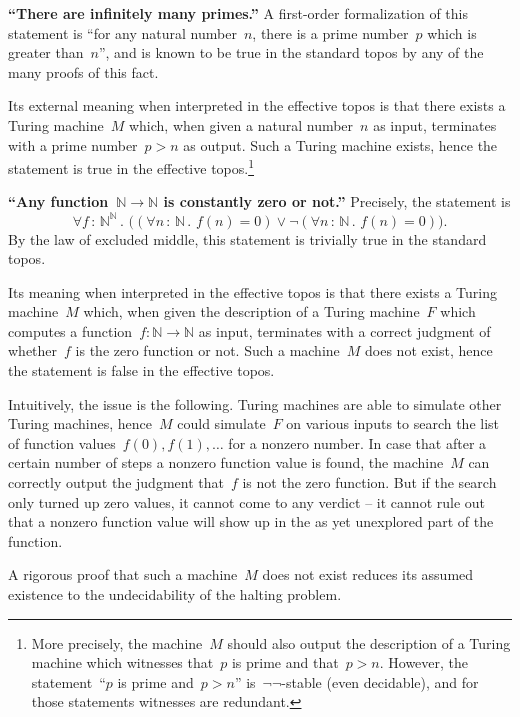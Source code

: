 \documentclass[graybox]{svmult}
\newcommand{\NN}{\mathbb{N}}
\renewcommand{\_}{\mathpunct{.}\,}
\newcommand{\effective}{ef{}fective\xspace}
\newcommand{\?}{\,{:}\,}
\begin{document}
\begin{example}\textbf{``There are infinitely many primes.''} A first-order formalization
of this statement is ``for any natural number~$n$, there is a prime
number~$p$ which is greater than~$n$'', and is known to be true in the standard
topos by any of the many proofs of this fact.

Its external meaning when interpreted in the \effective topos is that there exists
a Turing machine~$M$ which, when given a natural number~$n$ as input, terminates with a
prime number~$p > n$ as output. Such a Turing machine exists, hence the
statement is true in the \effective topos.\footnote{More precisely, the
machine~$M$ should also output the description of a Turing machine which
witnesses that~$p$ is prime and that~$p > n$. However, the statement~``$p$ is prime and~$p > n$''
is~$\neg\neg$-stable (even decidable), and for those statements witnesses are
redundant.}
\end{example}

\begin{example}\textbf{``Any function~$\NN \to \NN$ is constantly zero or not.''} Precisely,
the statement is
\[ \forall f \? \NN^\NN\_
  \bigl((\forall n \? \NN\_ f(n) = 0) \vee
  \neg
  (\forall n \? \NN\_ f(n) = 0)\bigr). \]
By the law of excluded middle, this statement is trivially true in the standard
topos.

Its meaning when interpreted in the \effective topos is that there exists a
Turing machine~$M$ which, when given the description of a Turing machine~$F$ which
computes a function~$f : \NN \to \NN$ as input, terminates with a correct
judgment of whether~$f$ is the zero function or not. Such a machine~$M$ does
not exist, hence the statement is false in the \effective topos.

Intuitively, the issue
is the following. Turing machines are able to simulate other Turing machines,
hence~$M$ could simulate~$F$ on various inputs to search the list of
function values~$f(0), f(1), \ldots$ for a nonzero number. In case that after
a certain number of steps a nonzero function value is found, the machine~$M$
can correctly output the judgment that~$f$ is not the zero function. But if the
search only turned up zero values, it cannot come to any verdict -- it cannot
rule out that a nonzero function value will show up in the as yet unexplored
part of the function.

A rigorous proof that such a machine~$M$ does not exist reduces its assumed
existence to the undecidability of the halting problem.
\end{example}
\end{document}
